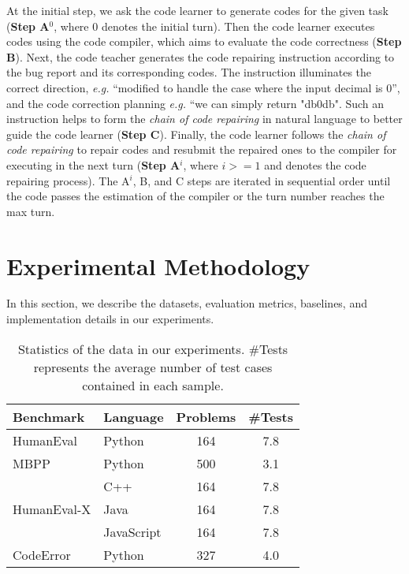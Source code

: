 \documentclass[11pt]{article}
\begin{document}
At the initial step, we ask the code learner to generate codes for the given task (\textbf{Step A$^0$}, where $0$ denotes the initial turn). Then the code learner executes codes using the code compiler, which aims to evaluate the code correctness (\textbf{Step B}). Next, the code teacher generates the code repairing instruction according to the bug report and its corresponding codes. The instruction illuminates the correct direction, \textit{e.g.} ``modified to handle the case where
the input decimal is 0'', and the code correction planning \textit{e.g.} ``we can simply return "db0db". Such an instruction helps to form the \textit{chain of code repairing} in natural language to better guide the code learner (\textbf{Step C}). Finally, the code learner follows the \textit{chain of code repairing} to repair codes and resubmit the repaired ones to the compiler for executing in the next turn (\textbf{Step A$^i$}, where $i>=1$ and denotes the code repairing process). The A$^i$, B, and C steps are iterated in sequential order until the code passes the estimation of the compiler or the turn number reaches the max turn.

 





\section{Experimental Methodology}
In this section, we describe the datasets, evaluation metrics, baselines, and implementation details in our experiments.



\begin{table}[]
\small
\centering
\caption{Statistics of the data in our experiments. \#Tests represents the average number of test cases contained in each sample.}
\label{tab:data_statistic}
\begin{tabular}{llcc}
\hline
\textbf{Benchmark}           & \textbf{Language} & \textbf{Problems} & \textbf{\#Tests} \\ \hline
HumanEval                    & Python            & 164               & 7.8                \\ \hline
MBPP                         & Python            & 500               & 3.1                \\ \hline
\multirow{3}{*}{HumanEval-X} & C++               & 164               & 7.8                \\
                             & Java              & 164               & 7.8                \\
                             & JavaScript        & 164               & 7.8                \\ \hline
CodeError                    & Python            & 327               & 4.0                \\ \hline
\end{tabular}
\end{table}
\end{document}
